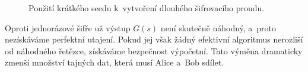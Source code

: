 \begin{figure}[ht]
    \centering
    
    \caption{Použití krátkého seedu k~vytvoření dlouhého šifrovacího proudu.}
    \label{fig:krypto-prg-kryptografie}
\end{figure}

Oproti jednorázové šifře už výstup $G(s)$ není skutečně náhodný, a~proto nezískáváme perfektní utajení. Pokud jej však žádný efektivní algoritmus nerozliší od náhodného řetězce, získáváme bezpečnost výpočetní. Tato výměna dramaticky zmenší množství tajných dat, která musí Alice a~Bob sdílet.


